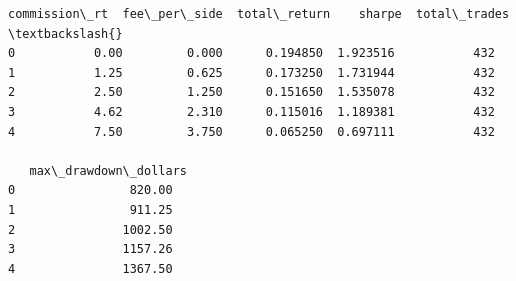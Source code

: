 \documentclass[11pt]{article}
\begin{document}
    
    \begin{Verbatim}[commandchars=\\\{\}]
   commission\_rt  fee\_per\_side  total\_return    sharpe  total\_trades  \textbackslash{}
0           0.00         0.000      0.194850  1.923516           432   
1           1.25         0.625      0.173250  1.731944           432   
2           2.50         1.250      0.151650  1.535078           432   
3           4.62         2.310      0.115016  1.189381           432   
4           7.50         3.750      0.065250  0.697111           432   

   max\_drawdown\_dollars  
0                820.00  
1                911.25  
2               1002.50  
3               1157.26  
4               1367.50  
    \end{Verbatim}

    
    \begin{center}
    \end{center}
    { \hspace*{\fill} \\}
    
\end{document}
